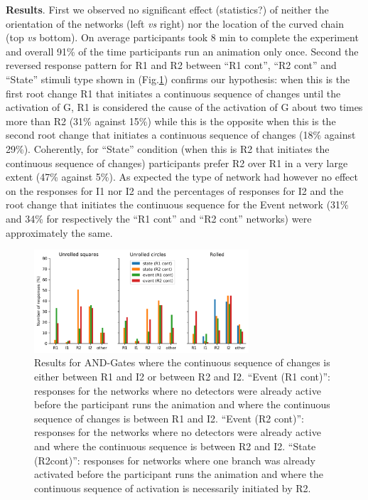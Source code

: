 \documentclass[10pt,letterpaper]{article}
\begin{document}
\textbf{Results}. First we observed no significant effect (statistics?) of neither the orientation of the networks (left \textit{vs} right) nor the location of the curved chain (top \textit{vs} bottom). On average participants took 8 min to complete the experiment and overall 91\% of the time participants run an animation only once. Second the reversed response pattern for R1 and R2 between ``R1 cont'', ``R2 cont'' and ``State'' stimuli type shown in (Fig.\ref{fig:4}) confirms our hypothesis: when this is the first root change R1 that initiates a continuous sequence of changes until the activation of G, R1 is considered the cause of the activation of G about two times more than R2 (31\% against 15\%) while this is the opposite when this is the second root change that initiates a continuous sequence of changes (18\% against 29\%). Coherently, for ``State'' condition (when this is R2 that initiates the continuous sequence of changes) participants prefer R2 over R1 in a very large extent (47\% against 5\%). As expected the type of network had however no effect on the responses for I1 nor I2 and the percentages of responses for I2 and the root change that initiates the continuous sequence for the Event network (31\% and 34\% for respectively the ``R1 cont'' and ``R2 cont'' networks) were approximately the same.

\begin{figure}[H]
\begin{center}
\includegraphics[width=8cm]{results_E2}
\end{center}
\caption{Results for AND-Gates where the continuous sequence of changes is either between R1 and I2 or between R2 and I2. ``Event (R1 cont)'': responses for the networks where no detectors were already active before the participant runs the animation and where the continuous sequence of changes is between R1 and I2. ``Event (R2 cont)'': responses for the networks where no detectors were already active and where the continuous sequence is between R2 and I2. ``State (R2cont)'': responses for networks where one branch was already activated before the participant runs the animation and where the continuous sequence of activation is necessarily initiated by R2.} 
\label{fig:4}
\end{figure}
\end{document}
